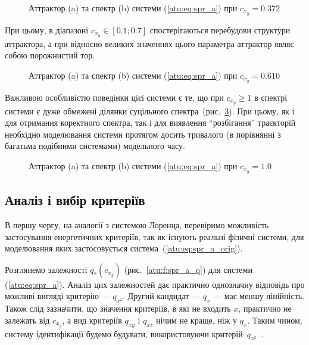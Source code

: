\begin{figure}[htb!]
\caption{Аттрактор (a) та спектр (b) системи (\ref{atu:eq:spr_a}) при $c_{x_y} =0.372$}
\label{atu:f:spr_a_p_0372}
\end{figure}

При цьому, в діапазоні
$c_{x_y} \in [0.1; 0.7]$ спостерігаються перебудови структури аттрактора,
а при відносно великих значеннях цього параметра аттрактор
являє собою порожнистий тор.

\begin{figure}[htb!]
\caption{Аттрактор (a) та спектр (b) системи (\ref{atu:eq:spr_a}) при $c_{x_y} =0.610$}
\label{atu:f:spr_a_p_0610}
\end{figure}




Важливою особливістю поведінки цієї системи є те, що при
$c_{x_y} \ge 1$ в спектрі системи є дуже обмежені ділянки суцільного
спектра~(рис.~\ref{atu:f:spr_a_p_1000}). При цьому, як і для отримання
коректного спектра, так і для виявлення ``розбігання'' траєкторій
необхідно моделювання системи протягом досить тривалого (в
порівнянні з багатьма подібними системами) модельного часу.

\begin{figure}[htb!]
\caption{Аттрактор (a) та спектр (b) системи (\ref{atu:eq:spr_a}) при $c_{x_y} =1.0$}
\label{atu:f:spr_a_p_1000}
\end{figure}



\subsection{Аналіз і вибір критеріїв} %

В першу чергу, на аналогії з системою Лоренца, перевіримо
можливість застосування енергетичних критеріїв, так як існують
реальні фізичні системи, для моделювання яких застосовується
система~(\ref{atu:eq:spr_a_orig}).

Розглянемо залежності
$q_{*} (c_{x_y})$ (рис.~\ref{atu:f:spr_a_q}) для системи (\ref{atu:eq:spr_a}). Аналіз цих
залежностей дає практично однозначну відповідь про можливі
вигляді критерію ---
$q_{x^2}$. Другий кандидат ---
$q_{x}$ --- має меншу лінійність. Також слід зазначити, що значення
критеріїв, в які не входить
$x$, практично не залежать від
$c_{x_y}$, а вид критеріїв
$q_{xy}$ і
$q_{xz}$ нічим не краще, ніж у
$q_{x}$. Таким чином, систему ідентифікації будемо будувати,
використовуючи критерій~$q_{x^2}$~\cite{atu_kher2016}.


